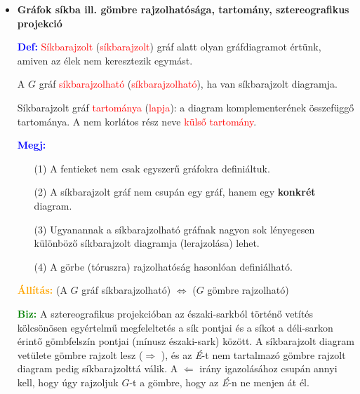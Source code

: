 \documentclass[../../szobeli.tex]{subfiles}
\begin{document}
\begin{center}
    \noindent{}
\end{center}

    \begin{itemize}
        \item \textbf{Gráfok síkba ill. gömbre rajzolhatósága, tartomány, sztereografikus projekció} 

            \textcolor{blue}{\textbf{Def:}} \textcolor{red}{Síkbarajzolt} (\textcolor{red}{síkbarajzolt}) gráf alatt olyan gráfdiagramot értünk, amiven az  élek nem keresztezik egymást.

            A $G$ gráf \textcolor{red}{síkbarajzolható} (\textcolor{red}{síkbarajzolható}), ha van síkbarajzolt diagramja. 

            Síkbarajzolt gráf \textcolor{red}{tartománya} (\textcolor{red}{lapja}): a diagram komplementerének összefüggő tartománya. A nem korlátos rész neve \textcolor{red}{külső tartomány}. 

            \textcolor{blue}{\textbf{Megj:}} \begin{itemize}
                \item[(1)] A fentieket nem csak egyszerű gráfokra definiáltuk.
                \item[(2)] A síkbarajzolt gráf nem csupán egy gráf, hanem egy \textbf{konkrét} diagram. 
                \item[(3)] Ugyanannak a síkbarajzolható gráfnak nagyon sok lényegesen különböző síkbarajzolt diagramja (lerajzolása) lehet.
                \item[(4)] A görbe (tóruszra) rajzolhatóság hasonlóan definiálható.
            \end{itemize}

            \textcolor{orange}{\textbf{Állítás:}} (A $G$ gráf síkbarajzolható) $\Longleftrightarrow$ ($G$ gömbre rajzolható) 

            \textcolor{green}{\textbf{Biz:}} A sztereografikus projekcióban az északi-sarkból történő vetítés kölcsönösen egyértelmű megfeleltetés a sík pontjai és a síkot a déli-sarkon érintő gömbfelszín pontjai (mínusz északi-sark) között. A síkbarajzolt diagram vetülete gömbre rajzolt lesz ($\Rightarrow$ \checkmark), és az \textit{É}-t nem tartalmazó gömbre rajzolt diagram pedig síkbarajzolttá válik. A $\Leftarrow$ irány igazolásához csupán annyi kell, hogy úgy rajzoljuk $G$-t a gömbre, hogy az \textit{É}-n ne menjen át él. 


\end{itemize}
\end{document}

